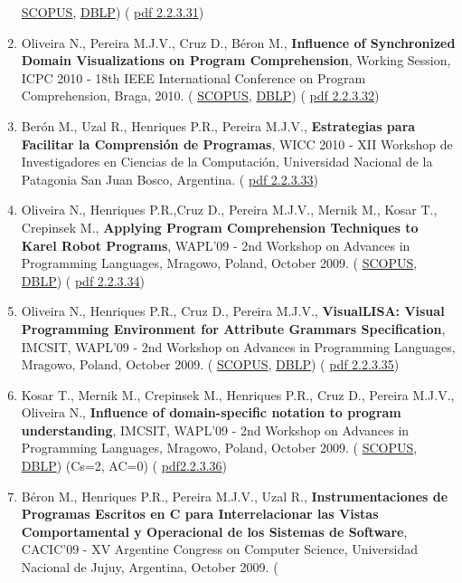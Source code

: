 \documentclass[11pt]{article}
\begin{document}
\begin{enumerate}
{\href{run:Publicacoes/PublicacoesSCOPUS.pdf}{SCOPUS}, 
\href{run:Publicacoes/ComprovativosDBLP.pdf}{DBLP}) (
\href{run:Publicacoes/publicacoes/53.pdf}{pdf 2.2.3.31})}
\item{Oliveira N., Pereira M.J.V., Cruz D., Béron M., {
\bf{ Influence of Synchronized Domain Visualizations on Program Comprehension}}, Working Session, ICPC 2010 - 18th IEEE International Conference on Program Comprehension, Braga, 2010. (
\href{run:Publicacoes/PublicacoesSCOPUS.pdf}{SCOPUS}, 
\href{run:Publicacoes/ComprovativosDBLP.pdf}{DBLP}) (
\href{run:Publicacoes/publicacoes/54.pdf}{pdf 2.2.3.32})}
\item{Berón M., Uzal R., Henriques P.R., Pereira M.J.V., {
\bf{ Estrategias para Facilitar la Comprensión de Programas}}, WICC 2010 - XII Workshop de Investigadores en Ciencias de la Computación, Universidad Nacional de la Patagonia San Juan Bosco, Argentina. (
\href{run:Publicacoes/publicacoes/51.pdf}{pdf 2.2.3.33})}
\item{Oliveira N., Henriques P.R.,Cruz D., Pereira M.J.V., Mernik M., Kosar T., Crepinsek M., {
\bf{ Applying Program Comprehension Techniques to Karel Robot Programs}}, WAPL'09 - 2nd Workshop on Advances in Programming Languages, Mragowo, Poland, October 2009. (
\href{run:Publicacoes/PublicacoesSCOPUS.pdf}{SCOPUS}, 
\href{run:Publicacoes/ComprovativosDBLP.pdf}{DBLP}) (
\href{run:Publicacoes/publicacoes/39.pdf}{pdf 2.2.3.34})}
\item{Oliveira N., Henriques P.R., Cruz D., Pereira M.J.V., {
\bf{ VisualLISA: Visual Programming Environment for Attribute Grammars Specification}}, IMCSIT, WAPL'09 - 2nd Workshop on Advances in Programming Languages, Mragowo, Poland, October 2009. (
\href{run:Publicacoes/PublicacoesSCOPUS.pdf}{SCOPUS}, 
\href{run:Publicacoes/ComprovativosDBLP.pdf}{DBLP}) (
\href{run:Publicacoes/publicacoes/44.pdf}{pdf 2.2.3.35})}
\item{Kosar T., Mernik M., Crepinsek M., Henriques P.R., Cruz D., Pereira M.J.V., Oliveira N., {
\bf{ Influence of domain-specific notation to program understanding}}, IMCSIT, WAPL'09 - 2nd Workshop on Advances in Programming Languages, Mragowo, Poland, October 2009. (
\href{run:Publicacoes/PublicacoesSCOPUS.pdf}{SCOPUS}, 
\href{run:Publicacoes/ComprovativosDBLP.pdf}{DBLP}) (Cs=2, AC=0) (
\href{run:Publicacoes/publicacoes/43.pdf}{pdf2.2.3.36})}
\item{Béron M., Henriques P.R., Pereira M.J.V., Uzal R., {
\bf{ Instrumentaciones de Programas Escritos en C para Interrelacionar las Vistas Comportamental y Operacional de los Sistemas de Software}}, CACIC'09 - XV Argentine Congress on Computer Science, Universidad Nacional de Jujuy, Argentina, October 2009. (
}
\end{enumerate}
\end{document}
